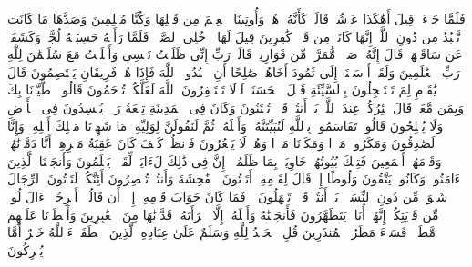 \startbuffer[\q:27:42]
فَلَمَّا جَاۤءَتۡ قِیلَ أَهَٰكَذَا عَرۡشُكِۖ قَالَتۡ كَأَنَّهُۥ هُوَۚ وَأُوتِینَا ٱلۡعِلۡمَ مِن قَبۡلِهَا وَكُنَّا مُسۡلِمِینَ%
\stopbuffer%
\startbuffer[\q:27:43]
وَصَدَّهَا مَا كَانَت تَّعۡبُدُ مِن دُونِ ٱللَّهِۖ إِنَّهَا كَانَتۡ مِن قَوۡمࣲ كَٰفِرِینَ%
\stopbuffer%
\startbuffer[\q:27:44]
قِیلَ لَهَا ٱدۡخُلِی ٱلصَّرۡحَۖ فَلَمَّا رَأَتۡهُ حَسِبَتۡهُ لُجَّةࣰ وَكَشَفَتۡ عَن سَاقَیۡهَاۚ قَالَ إِنَّهُۥ صَرۡحࣱ مُّمَرَّدࣱ مِّن قَوَارِیرَۗ قَالَتۡ رَبِّ إِنِّی ظَلَمۡتُ نَفۡسِی وَأَسۡلَمۡتُ مَعَ سُلَیۡمَٰنَ لِلَّهِ رَبِّ ٱلۡعَٰلَمِینَ%
\stopbuffer%
\startbuffer[\q:27:45]
وَلَقَدۡ أَرۡسَلۡنَاۤ إِلَىٰ ثَمُودَ أَخَاهُمۡ صَٰلِحًا أَنِ ٱعۡبُدُوا۟ ٱللَّهَ فَإِذَا هُمۡ فَرِیقَانِ یَخۡتَصِمُونَ%
\stopbuffer%
\startbuffer[\q:27:46]
قَالَ یَٰقَوۡمِ لِمَ تَسۡتَعۡجِلُونَ بِٱلسَّیِّئَةِ قَبۡلَ ٱلۡحَسَنَةِۖ لَوۡلَا تَسۡتَغۡفِرُونَ ٱللَّهَ لَعَلَّكُمۡ تُرۡحَمُونَ%
\stopbuffer%
\startbuffer[\q:27:47]
قَالُوا۟ ٱطَّیَّرۡنَا بِكَ وَبِمَن مَّعَكَۚ قَالَ طَٰۤئِرُكُمۡ عِندَ ٱللَّهِۖ بَلۡ أَنتُمۡ قَوۡمࣱ تُفۡتَنُونَ%
\stopbuffer%
\startbuffer[\q:27:48]
وَكَانَ فِی ٱلۡمَدِینَةِ تِسۡعَةُ رَهۡطࣲ یُفۡسِدُونَ فِی ٱلۡأَرۡضِ وَلَا یُصۡلِحُونَ%
\stopbuffer%
\startbuffer[\q:27:49]
قَالُوا۟ تَقَاسَمُوا۟ بِٱللَّهِ لَنُبَیِّتَنَّهُۥ وَأَهۡلَهُۥ ثُمَّ لَنَقُولَنَّ لِوَلِیِّهِۦ مَا شَهِدۡنَا مَهۡلِكَ أَهۡلِهِۦ وَإِنَّا لَصَٰدِقُونَ%
\stopbuffer%
\startbuffer[\q:27:50]
وَمَكَرُوا۟ مَكۡرࣰا وَمَكَرۡنَا مَكۡرࣰا وَهُمۡ لَا یَشۡعُرُونَ%
\stopbuffer%
\startbuffer[\q:27:51]
فَٱنظُرۡ كَیۡفَ كَانَ عَٰقِبَةُ مَكۡرِهِمۡ أَنَّا دَمَّرۡنَٰهُمۡ وَقَوۡمَهُمۡ أَجۡمَعِینَ%
\stopbuffer%
\startbuffer[\q:27:52]
فَتِلۡكَ بُیُوتُهُمۡ خَاوِیَةَۢ بِمَا ظَلَمُوۤا۟ۚ إِنَّ فِی ذَٰلِكَ لَءَایَةࣰ لِّقَوۡمࣲ یَعۡلَمُونَ%
\stopbuffer%
\startbuffer[\q:27:53]
وَأَنجَیۡنَا ٱلَّذِینَ ءَامَنُوا۟ وَكَانُوا۟ یَتَّقُونَ%
\stopbuffer%
\startbuffer[\q:27:54]
وَلُوطًا إِذۡ قَالَ لِقَوۡمِهِۦۤ أَتَأۡتُونَ ٱلۡفَٰحِشَةَ وَأَنتُمۡ تُبۡصِرُونَ%
\stopbuffer%
\startbuffer[\q:27:55]
أَئِنَّكُمۡ لَتَأۡتُونَ ٱلرِّجَالَ شَهۡوَةࣰ مِّن دُونِ ٱلنِّسَاۤءِۚ بَلۡ أَنتُمۡ قَوۡمࣱ تَجۡهَلُونَ%
\stopbuffer%
\startbuffer[\q:27:56]
۞ فَمَا كَانَ جَوَابَ قَوۡمِهِۦۤ إِلَّاۤ أَن قَالُوۤا۟ أَخۡرِجُوۤا۟ ءَالَ لُوطࣲ مِّن قَرۡیَتِكُمۡۖ إِنَّهُمۡ أُنَاسࣱ یَتَطَهَّرُونَ%
\stopbuffer%
\startbuffer[\q:27:57]
فَأَنجَیۡنَٰهُ وَأَهۡلَهُۥۤ إِلَّا ٱمۡرَأَتَهُۥ قَدَّرۡنَٰهَا مِنَ ٱلۡغَٰبِرِینَ%
\stopbuffer%
\startbuffer[\q:27:58]
وَأَمۡطَرۡنَا عَلَیۡهِم مَّطَرࣰاۖ فَسَاۤءَ مَطَرُ ٱلۡمُنذَرِینَ%
\stopbuffer%
\startbuffer[\q:27:59]
قُلِ ٱلۡحَمۡدُ لِلَّهِ وَسَلَٰمٌ عَلَىٰ عِبَادِهِ ٱلَّذِینَ ٱصۡطَفَىٰۤۗ ءَاۤللَّهُ خَیۡرٌ أَمَّا یُشۡرِكُونَ%
\stopbuffer%
\startbuffer[\q:27:60]
